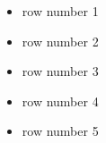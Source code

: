 \documentclass{article}
\begin{document}
	\begin{itemize}[arg1, arg2]
		\item
			row number 1
		\item
			row number 2
		\item
			row number 3
		\item
			row number 4
		\item
			row number 5
	\end{itemize}
\end{document}
